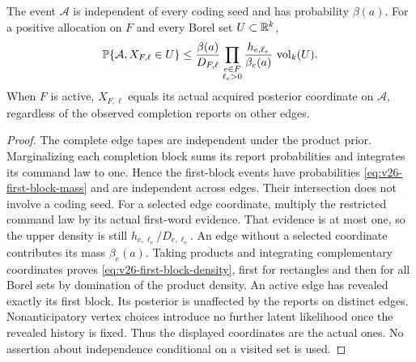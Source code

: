\begin{lemma}\label{lem:v26-first-block}
The event $\mathcal A$ is independent of every coding seed and has
probability $\beta(a)$. For a positive allocation on $F$ and every
Borel set $U\subset\mathbb R^k$,
\begin{equation}\label{eq:v26-first-block-density}
 \mathbb P\{\mathcal A, X_{F,\ell}\in U\}
 \le \frac{\beta(a)}{D_{F,\ell}}
       \prod_{\substack{e\in F\\\ell_e>0}}
              \frac{h_{e,\ell_e}}{\beta_e(a)}\,
              \operatorname{vol}_k(U).
\end{equation}
When $F$ is active, $X_{F,\ell}$ equals its actual acquired
posterior coordinate on $\mathcal A$, regardless of the observed
completion reports on other edges.
\end{lemma}
\begin{proof}
The complete edge tapes are independent under the product prior.
Marginalizing each completion block sums its report probabilities and
integrates its command law to one. Hence the first-block events have
probabilities \eqref{eq:v26-first-block-mass} and are independent
across edges. Their intersection does not involve a coding seed.
For a selected edge coordinate, multiply the restricted command law
by its actual first-word evidence. That evidence is at most one, so
the upper density is still $h_{e,\ell_e}/D_{e,\ell_e}$. An edge
without a selected coordinate contributes its mass $\beta_e(a)$.
Taking products and integrating complementary coordinates proves
\eqref{eq:v26-first-block-density}, first for rectangles and then for
all Borel sets by domination of the product density.
An active edge has revealed exactly its first block. Its posterior
is unaffected by the reports on distinct edges. Nonanticipatory vertex
choices introduce no further latent likelihood once the revealed
history is fixed. Thus the displayed coordinates are the actual ones.
No assertion about independence conditional on a visited set is used.
\end{proof}

